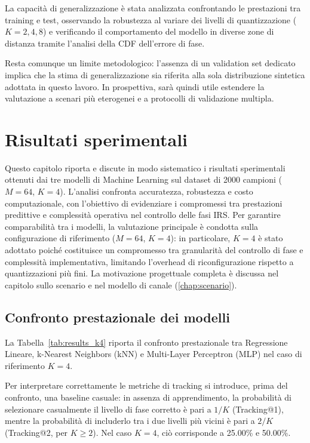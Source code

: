 \documentclass[12pt,a4paper]{report}
\begin{document}
La capacità di generalizzazione è stata analizzata confrontando le
prestazioni tra training e test, osservando la robustezza al variare
dei livelli di quantizzazione ($K=2,4,8$) e verificando il
comportamento del modello in diverse zone di distanza tramite
l'analisi della CDF dell'errore di fase.

Resta comunque un limite metodologico: l'assenza di un validation set
dedicato implica che la stima di generalizzazione sia riferita alla
sola distribuzione sintetica adottata in questo lavoro. In
prospettiva, sarà quindi utile estendere la valutazione a scenari più
eterogenei e a protocolli di validazione multipla.

\chapter{Risultati sperimentali}
\label{chap:risultati}

Questo capitolo riporta e discute in modo sistematico i risultati
sperimentali ottenuti dai tre modelli di Machine Learning sul dataset
di 2000 campioni ($M=64$, $K=4$). L'analisi confronta accuratezza,
robustezza e costo computazionale, con l'obiettivo di evidenziare i
compromessi tra prestazioni predittive e complessità operativa nel
controllo delle fasi IRS. Per garantire comparabilità tra i modelli,
la valutazione principale è condotta sulla configurazione di
riferimento ($M=64$, $K=4$): in particolare, $K=4$ è stato adottato
poiché costituisce un compromesso tra granularità del controllo di
fase e complessità implementativa, limitando l'overhead di
riconfigurazione rispetto a quantizzazioni più fini. La motivazione
progettuale completa è discussa nel capitolo sullo scenario e nel
modello di canale (\cref{chap:scenario}).

\section{Confronto prestazionale dei modelli}
La Tabella~\ref{tab:results_k4} riporta il confronto prestazionale
tra Regressione Lineare, k-Nearest Neighbors (kNN) e
Multi-Layer Perceptron (MLP) nel caso di riferimento $K=4$.

Per interpretare correttamente le metriche di tracking si introduce,
prima del confronto, una baseline casuale: in assenza di
apprendimento, la probabilità di selezionare casualmente il livello
di fase corretto è pari a $1/K$ (Tracking@1), mentre la probabilità
di includerlo tra i due livelli più vicini è pari a $2/K$
(Tracking@2, per $K\geq 2$). Nel caso $K=4$, ciò corrisponde a
25.00\% e 50.00\%.
\end{document}
